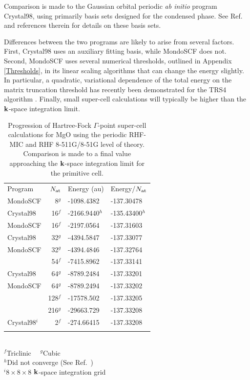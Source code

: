 \documentclass[prb,aps,nobibnotes,twocolumn,doublespace,twocolumngrid,superbib]{revtex4}
\begin{document}
Comparison is made to the Gaussian orbital periodic {\em ab initio} program {\sc Crystal98}, using
primarily basis sets designed for the condensed phase.  See Ref.~ and references 
therein for details on these basis sets. 


Differences between the two programs are likely to arise from several factors.  First, {\sc Crystal98}
 uses an auxiliary fitting basis, while {\sc MondoSCF} does not.  Second, {\sc MondoSCF} uses several 
numerical thresholds, outlined in Appendix \ref{Thresholds}, in its linear scaling algorithms that can change 
the energy slightly.   In particular, a quadratic, variational dependence of the total energy
on the  matrix truncation threshold has recently been demonstrated for the {\sc TRS4} algorithm 
\cite{ANiklasson03}.  Finally, small super-cell calculations will typically be higher than the 
$\bf k$-space integration limit.  


\begin{table}[h]
\caption{Progression of Hartree-Fock $\Gamma$-point super-cell calculations 
for MgO using the periodic RHF-MIC and RHF 8-511G/8-51G level of theory.  Comparison is 
made to a final value approaching the $\bf k$-space integration limit for the primitive cell.}
\label{MgOTable}
\begin{tabular}{lrll}
\toprule
Program         & $N_{\rm at}$              & Energy (au)    & Energy/$N_{\rm at}$\\ 
\colrule
{\sc MondoSCF}       & 8$^g$    & -1098.4382     & -137.30478  \\
{\sc Crystal98}      & 16$^f$   & -2166.9440$^h$ & -135.43400$^h$ \\
{\sc MondoSCF}       & 16$^f$   & -2197.0564     & -137.31603  \\
{\sc Crystal98}      & 32$^g$   & -4394.5847     & -137.33077  \\
{\sc MondoSCF}       & 32$^g$   & -4394.4846     & -137.32764  \\
                     & 54$^f$   & -7415.8962     & -137.33141  \\
{\sc Crystal98}      & 64$^g$   & -8789.2484     & -137.33201  \\
{\sc MondoSCF}       & 64$^g$   & -8789.2494     & -137.33202  \\
                     & 128$^f$  & -17578.502     & -137.33205  \\
                     & 216$^g$  & -29663.729     & -137.33208  \\ 
\hline
{\sc Crystal98}$^i$  & 2$^f$    & -274.66415     & -137.33208  \\ 
\botrule 
\end{tabular}\\
$^f$Triclinic~~
$^g$Cubic \\
$^h$Did not converge (See Ref.~\cite{BCivalleri02}) \\
$^i 8\times8\times8$ $\bf k$-space integration grid  \\
\end{table}
\end{document}
